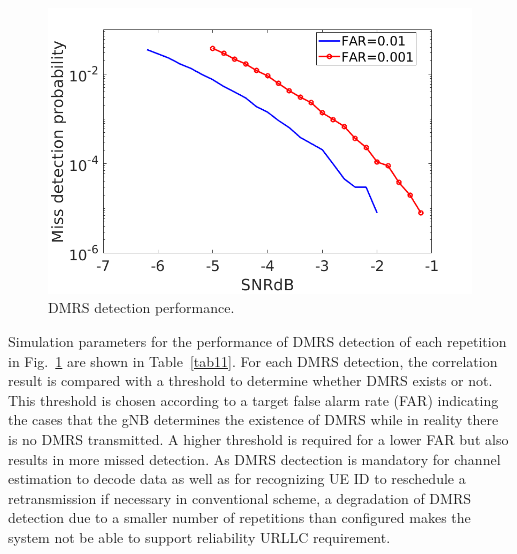 \documentclass{report}
\begin{document}
\begin{figure}[htbp]
\centerline{\includegraphics[scale=0.3]{fig26.png}}
\caption{DMRS detection performance.}
\label{fig26}

\end{figure}

Simulation parameters for the performance of DMRS detection of each repetition in Fig.~\ref{fig26} are shown in Table~\ref{tab11}. For each DMRS detection, the correlation result is compared with a threshold to determine whether DMRS exists or not. This threshold is chosen according to a target false alarm rate (FAR) indicating the cases that the gNB determines the existence of DMRS while in reality there is no DMRS transmitted. A higher threshold is required for a lower FAR but also results in more missed detection. As DMRS dectection is mandatory for channel estimation to decode data as well as for recognizing UE ID to reschedule a retransmission if necessary in conventional scheme, a degradation of DMRS detection due to a smaller number of repetitions than configured makes the system not be able to support reliability URLLC requirement.
\end{document}
